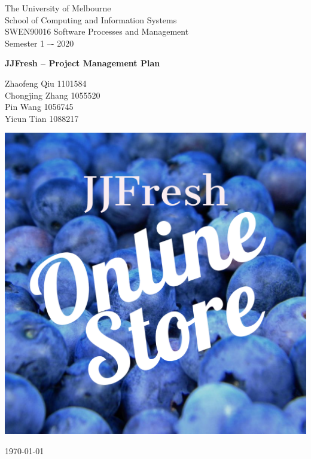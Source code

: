\documentclass{report}
\begin{document}
\begin{titlepage}
	\clearpage\thispagestyle{empty}
	\centering
	\vspace{1cm}

	{\normalsize The University of Melbourne \\ 
		School of Computing and Information Systems \\
		SWEN90016 Software Processes and Management\\
		Semester 1 –- 2020 \par}
		\vspace{3cm}
	{\Huge \textbf{JJFresh -- Project Management Plan}} \\
	\vspace{4cm}
	{\normalsize Zhaofeng Qiu 1101584 \\ %
	             Chongjing Zhang 1055520 \\
	             Pin Wang 1056745\\
                 Yicun Tian 1088217\par}
	\vspace{3cm}
    
    \centering \includegraphics[scale=0.12]{logo.pdf}
    
    \vspace{0.5cm}
		
	{\normalsize \today \par}
	\pagebreak
\end{titlepage}
\end{document}
